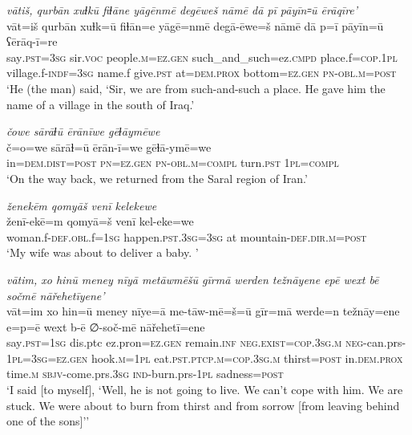 \ea \label{ZQ.5}
\textit{vātiš, qurbān xuɫkū fiɫāne yāgēnmē degēweš nāmē dā pī pāyīn꞊ū ērāqīre'} \\ 
\gll vāt=iš qurbān xuɫk=ū fiɫān=e yāgē=nmē degā-ēwe=š nāmē dā p=ī pāyīn=ū ʕērāq-ī=re \\ 
 say\textsc{.pst}\textsc{=3sg} sir.\textsc{voc} people\textsc{.m}\textsc{=ez.gen} such\_and\_such=ez\textsc{.cmpd} place.f\textsc{=cop}\textsc{.\textsc{1pl}} village.f\textsc{-indf}\textsc{=3sg} name.f give\textsc{.pst} at=\textsc{dem.prox} bottom\textsc{=ez.gen} \textsc{pn}\textsc{-obl}\textsc{.m}\textsc{=\textsc{post}} \\ 
\glt `He (the man) said, ‘Sir, we are from such-and-such a place. He gave him the name of a village in the south of Iraq.'
\z 
 
\ea \label{ZQ.10}
\textit{čowe sārāɫū ērānīwe gēɫāymēwe} \\ 
\gll č=o=we sārāɫ=ū ērān-ī=we gēɫā-ymē=we \\ 
 in=\textsc{dem.dist}\textsc{=\textsc{post}} \textsc{pn}\textsc{=ez.gen} \textsc{pn}\textsc{-obl}\textsc{.m}\textsc{=compl} turn\textsc{.pst} \textsc{1pl}\textsc{=compl} \\ 
\glt `On the way back, we returned from the Saral region of Iran.'
\z 
 
\ea \label{ZQ.14}
\textit{ženekēm qomyāš venī kelekewe} \\ 
\gll ženī-ekē=m qomyā=š venī kel-eke=we \\ 
 woman.f\textsc{-def}\textsc{.obl}.f\textsc{=\textsc{1sg}} happen\textsc{.pst}\textsc{.3sg}\textsc{=3sg} at mountain\textsc{-def}\textsc{.dir}\textsc{.m}\textsc{=\textsc{post}} \\ 
\glt `My wife was about to deliver a baby. '
\z 
 
\ea \label{ZQ.25}
\textit{vātim, xo hinū meney nīyā metāwmēšū gīrmā werden težnāyene epē wext bē sočmē nāřehetīyene’} \\ 
\gll vāt=im xo hin=ū meney nīye=ā me-tāw-mē=š=ū gīr=mā werde=n težnāy=ene e=p=ē wext b-ē ∅-soč-mē nāřehetī=ene \\ 
 say\textsc{.pst}\textsc{=\textsc{1sg}} dis.ptc ez.pron\textsc{=ez.gen} remain\textsc{.inf} \textsc{\textsc{neg.}exist}\textsc{=cop}\textsc{.3sg}\textsc{.m} \textsc{neg-}can.prs\textsc{-\textsc{1pl}}\textsc{=3sg}\textsc{=ez.gen} hook\textsc{.m}\textsc{=\textsc{1pl}} eat\textsc{.pst}\textsc{.ptcp}\textsc{.m}\textsc{=cop}\textsc{.3sg}\textsc{.m} thirst\textsc{=\textsc{post}} in.\textsc{dem.prox} time\textsc{.m} \textsc{sbjv-}come.prs\textsc{.3sg} \textsc{ind-}burn.prs\textsc{-\textsc{1pl}} sadness\textsc{=\textsc{post}} \\ 
\glt `I said [to myself], ‘Well, he is not going to live. We can’t cope with him. We are stuck. We were about to burn from thirst and from sorrow [from leaving behind one of the sons]’'
\z 
 
